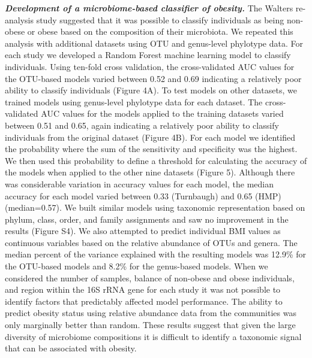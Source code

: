 \documentclass[12pt,]{article}
\begin{document}
\textbf{\emph{Development of a microbiome-based classifier of obesity.}}
The Walters re-analysis study suggested that it was possible to classify
individuals as being non-obese or obese based on the composition of
their microbiota. We repeated this analysis with additional datasets
using OTU and genus-level phylotype data. For each study we developed a
Random Forest machine learning model to classify individuals. Using
ten-fold cross validation, the cross-validated AUC values for the
OTU-based models varied between 0.52 and 0.69 indicating a relatively
poor ability to classify individuals (Figure 4A). To test models on
other datasets, we trained models using genus-level phylotype data for
each dataset. The cross-validated AUC values for the models applied to
the training datasets varied between 0.51 and 0.65, again indicating a
relatively poor ability to classify individuals from the original
dataset (Figure 4B). For each model we identified the probability where
the sum of the sensitivity and specificity was the highest. We then used
this probability to define a threshold for calculating the accuracy of
the models when applied to the other nine datasets (Figure 5). Although
there was considerable variation in accuracy values for each model, the
median accuracy for each model varied between 0.33 (Turnbaugh) and 0.65
(HMP) (median=0.57). We built similar models using taxonomic
representation based on phylum, class, order, and family assignments and
saw no improvement in the results (Figure S4). We also attempted to
predict individual BMI values as continuous variables based on the
relative abundance of OTUs and genera. The median percent of the
variance explained with the resulting models was 12.9\% for the
OTU-based models and 8.2\% for the genus-based models. When we
considered the number of samples, balance of non-obese and obese
individuals, and region within the 16S rRNA gene for each study it was
not possible to identify factors that predictably affected model
performance. The ability to predict obesity status using relative
abundance data from the communities was only marginally better than
random. These results suggest that given the large diversity of
microbiome compositions it is difficult to identify a taxonomic signal
that can be associated with obesity.
\end{document}
